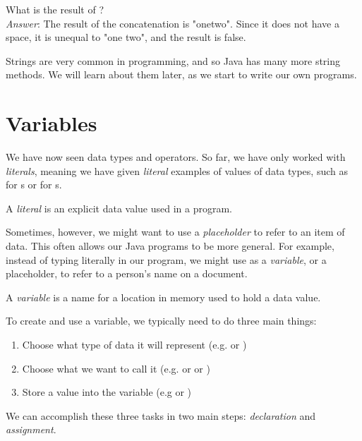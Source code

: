 \begin{example}
What is the result of ? \\

\noindent \emph{Answer}: The result of the concatenation is "onetwo". Since it does not have a space, it is unequal to "one two", and the result is false.
\end{example}

Strings are very common in programming, and so Java has many more string methods. We will learn about them later, as we start to write our own programs.

\section{Variables}
We have now seen data types and operators. So far, we have only worked with \emph{literals}, meaning we have given \emph{literal} examples of values of data types, such as  for s or  for s.

\begin{definition}
A \emph{literal} is an explicit data value used in a program.
\end{definition}

Sometimes, however, we might want to use a \emph{placeholder} to refer to an item of data. This often allows our Java programs to be more general. For example, instead of typing  literally in our program, we might use  as a \emph{variable}, or a placeholder, to refer to a person's name on a document.

\begin{definition}
A \emph{variable} is a name for a location in memory used to hold a data value.
\end{definition}

\noindent To create and use a variable, we typically need to do three main things:
\begin{enumerate}
 \item Choose what type of data it will represent (e.g.  or )
 \item Choose what we want to call it (e.g.  or  or )
 \item Store a value into the variable (e.g  or )
\end{enumerate}
We can accomplish these three tasks in two main steps: \emph{declaration} and \emph{assignment}.

